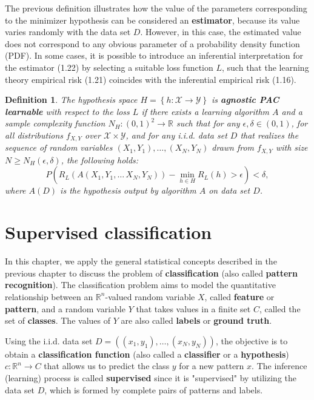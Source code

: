 \documentclass{report}
\newtheorem{definition}{Definition}[chapter]
\begin{document}
The previous definition illustrates how the value of the parameters corresponding to the minimizer hypothesis can be considered an \textbf{estimator}, because its value varies randomly with the data set $D$. However, in this case, the estimated value does not correspond to any obvious parameter of a probability density function (PDF). In some cases, it is possible to introduce an inferential interpretation for the estimator (1.22) by selecting a suitable loss function $L$, such that the learning theory empirical risk (1.21) coincides with the inferential empirical risk (1.16).

\begin{definition}
The hypothesis space $H = \left\{h : \mathcal{X} \to \mathcal{Y}\right\}$ is \textbf{agnostic PAC learnable} with respect to the loss $L$ if there exists a learning algorithm $A$ and a sample complexity function $N_H : (0,1) ^2 \to \mathbb{R}$ such that for any $\epsilon,\delta \in (0,1)$, for all distributions $f_{X,Y}$ over $\mathcal{X} \times \mathcal{Y}$, and for any i.i.d. data set $D$ that realizes the sequence of random variables $(X_1, Y_1),\dots,(X_N, Y_N)$ drawn from $f_{X,Y}$ with size $N\geq N_H(\epsilon,\delta)$, the following holds:
\begin{equation}
P\left(R_L(A(X_1, Y_1,\dots\,X_N, Y_N)) - \min_{h\in H}R_L(h) > \epsilon\right) < \delta,
\end{equation}
where $A(D)$ is the hypothesis output by algorithm $A$ on data set $D$.
\end{definition}

\chapter{Supervised classification}
In this chapter, we apply the general statistical concepts described in the previous chapter to discuss the problem of \textbf{classification} (also called \textbf{pattern recognition}). The classification problem aims to model the quantitative relationship between an $\mathbb{R}^n$-valued random variable $X$, called \textbf{feature} or \textbf{pattern}, and a random variable $Y$ that takes values in a finite set $C$, called the set of \textbf{classes}. The values of $Y$ are also called \textbf{labels} or \textbf{ground truth}.

Using the i.i.d. data set $D = ((x_1,y_1),\dots,(x_N,y_N))$, the objective is to obtain a \textbf{classification function} (also called a \textbf{classifier} or a \textbf{hypothesis}) $c : \mathbb{R}^n \to C$ that allows us to predict the class $y$ for a new pattern $x$. The inference (learning) process is called \textbf{supervised} since it is "supervised" by utilizing the data set $D$, which is formed by complete pairs of patterns and labels.
\end{document}
